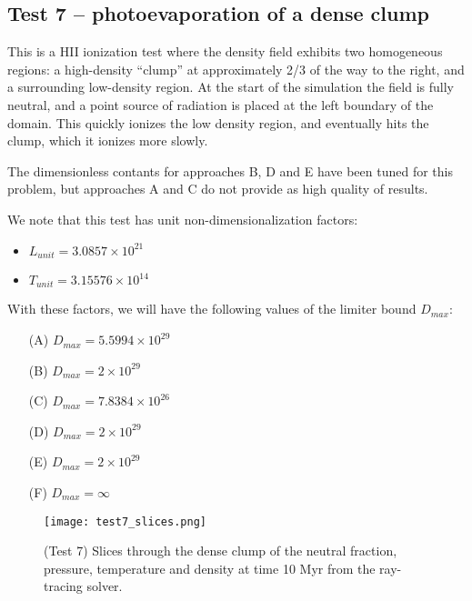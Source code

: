 \documentclass[letterpaper,11pt]{article}
\begin{document}
\subsection{Test 7 -- photoevaporation of a dense clump}
\label{sec:test7}

This is	a HII ionization test where the density field exhibits two
homogeneous regions: a high-density ``clump'' at approximately 2/3 of
the way to the right, and a surrounding low-density region.  At the
start of the simulation the field is fully neutral, and a point
source of radiation is placed at the left boundary of the domain.
This quickly ionizes the low density region, and eventually hits the
clump, which it ionizes more slowly.  

The dimensionless contants for approaches B, D and E have been
tuned for this problem, but approaches A and C do not provide
as high quality of results.

We note that this test has unit non-dimensionalization factors:
\begin{itemize}
\item $L_{unit} = 3.0857\times10^{21}$
\item $T_{unit} = 3.15576\times10^{14}$
\end{itemize}
With these factors, we will have the following values of the limiter
bound $D_{max}$:
\begin{itemize}
\item[(A)] $D_{max} = 5.5994\times10^{29}$
\item[(B)] $D_{max} = 2\times10^{29}$
\item[(C)] $D_{max} = 7.8384\times10^{26}$
\item[(D)] $D_{max} = 2\times10^{29}$
\item[(E)] $D_{max} = 2\times10^{29}$
\item[(F)] $D_{max} = \infty$
\end{itemize}


\begin{figure}[t]
  \centerline{
  \texttt{[image: test7\_slices.png]}
  }
  \caption{(Test 7) Slices through the dense clump of the neutral
    fraction, pressure, temperature and density at time 10 Myr from
    the ray-tracing solver.} 
  \label{fig:test7_slices_RT}
\end{figure}
\end{document}
